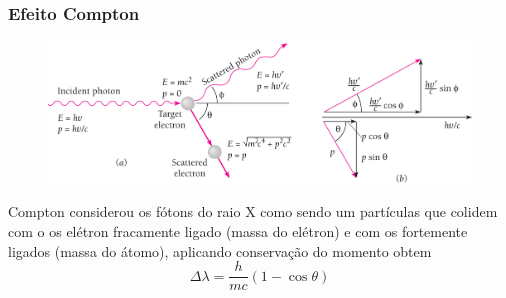 \documentclass[12pt,brazil]{beamer}
\begin{document}
\begin{frame}
  \frametitle{Efeito Compton}
        \vspace*{-0.75cm}
        \begin{figure}
          \includegraphics[width=12cm]{figuras/fig20}
        \end{figure}
        
      \fontsize{10pt}{11pt}\selectfont
        Compton considerou os fótons do raio X como sendo um partículas que colidem com o os elétron fracamente ligado (massa do elétron) e com os fortemente ligados (massa do átomo), aplicando conservação do momento obtem
        \[
         \Delta \lambda = \dfrac{h}{mc}\left(  1 - \cos \theta \right)
        \]


\end{frame}

\end{document}
